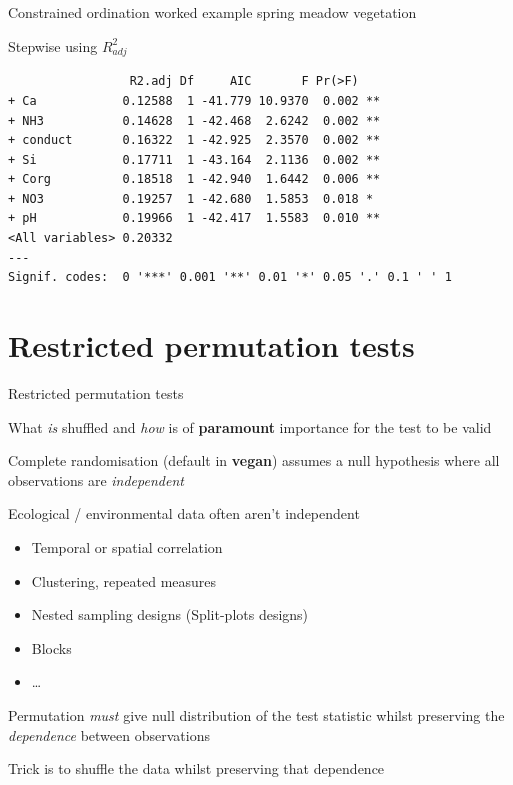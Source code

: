 \documentclass[10pt,ignorenonframetext,compress, aspectratio=169]{beamer}
\newenvironment{Shaded}{\begin{snugshade}}{\end{snugshade}}
\newcommand{\KeywordTok}[1]{\textcolor[rgb]{0.13,0.29,0.53}{\textbf{{#1}}}}
\newcommand{\DataTypeTok}[1]{\textcolor[rgb]{0.13,0.29,0.53}{{#1}}}
\newcommand{\StringTok}[1]{\textcolor[rgb]{0.31,0.60,0.02}{{#1}}}
\newcommand{\OtherTok}[1]{\textcolor[rgb]{0.56,0.35,0.01}{{#1}}}
\newcommand{\NormalTok}[1]{{#1}}
\providecommand{\tightlist}{%
  \setlength{\itemsep}{0pt}\setlength{\parskip}{0pt}}
\begin{document}
\begin{frame}[fragile]{Constrained ordination worked example \textbar{}
spring meadow vegetation}

Stepwise using \(R^2_{adj}\)

\scriptsize

\begin{Shaded}
\end{Shaded}

\begin{verbatim}
                 R2.adj Df     AIC       F Pr(>F)   
+ Ca            0.12588  1 -41.779 10.9370  0.002 **
+ NH3           0.14628  1 -42.468  2.6242  0.002 **
+ conduct       0.16322  1 -42.925  2.3570  0.002 **
+ Si            0.17711  1 -43.164  2.1136  0.002 **
+ Corg          0.18518  1 -42.940  1.6442  0.006 **
+ NO3           0.19257  1 -42.680  1.5853  0.018 * 
+ pH            0.19966  1 -42.417  1.5583  0.010 **
<All variables> 0.20332                             
---
Signif. codes:  0 '***' 0.001 '**' 0.01 '*' 0.05 '.' 0.1 ' ' 1
\end{verbatim}

\normalsize

\end{frame}

\section{Restricted permutation
tests}\label{restricted-permutation-tests}

\begin{frame}{Restricted permutation tests}

What \emph{is} shuffled and \emph{how} is of \textbf{paramount}
importance for the test to be valid

Complete randomisation (default in \textbf{vegan}) assumes a null
hypothesis where all observations are \emph{independent}

Ecological / environmental data often aren't independent

\begin{itemize}
\tightlist
\item
  Temporal or spatial correlation
\item
  Clustering, repeated measures
\item
  Nested sampling designs (Split-plots designs)
\item
  Blocks
\item
  \ldots{}
\end{itemize}

Permutation \emph{must} give null distribution of the test statistic
whilst preserving the \emph{dependence} between observations

Trick is to shuffle the data whilst preserving that dependence

\end{frame}
\end{document}
